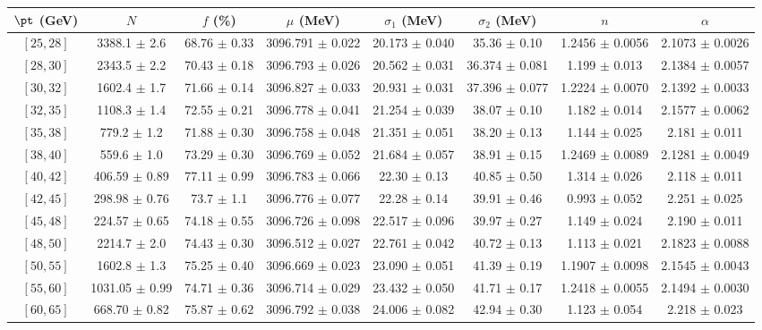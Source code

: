 \begin{tabular}{c||c|c|c|c|c|c|c}
$\pt$ (GeV) & $N$ & $f$ (\%) & $\mu$ (MeV) & $\sigma_1$ (MeV) & $\sigma_2$ (MeV) & $n$ & $\alpha$ \\
\hline
$[25, 28]$ & 3388.1 $\pm$ 2.6 & 68.76 $\pm$ 0.33 & 3096.791 $\pm$ 0.022 & 20.173 $\pm$ 0.040 & 35.36 $\pm$ 0.10 & 1.2456 $\pm$ 0.0056 & 2.1073 $\pm$ 0.0026\\
$[28, 30]$ & 2343.5 $\pm$ 2.2 & 70.43 $\pm$ 0.18 & 3096.793 $\pm$ 0.026 & 20.562 $\pm$ 0.031 & 36.374 $\pm$ 0.081 & 1.199 $\pm$ 0.013 & 2.1384 $\pm$ 0.0057\\
$[30, 32]$ & 1602.4 $\pm$ 1.7 & 71.66 $\pm$ 0.14 & 3096.827 $\pm$ 0.033 & 20.931 $\pm$ 0.031 & 37.396 $\pm$ 0.077 & 1.2224 $\pm$ 0.0070 & 2.1392 $\pm$ 0.0033\\
$[32, 35]$ & 1108.3 $\pm$ 1.4 & 72.55 $\pm$ 0.21 & 3096.778 $\pm$ 0.041 & 21.254 $\pm$ 0.039 & 38.07 $\pm$ 0.10 & 1.182 $\pm$ 0.014 & 2.1577 $\pm$ 0.0062\\
$[35, 38]$ & 779.2 $\pm$ 1.2 & 71.88 $\pm$ 0.30 & 3096.758 $\pm$ 0.048 & 21.351 $\pm$ 0.051 & 38.20 $\pm$ 0.13 & 1.144 $\pm$ 0.025 & 2.181 $\pm$ 0.011\\
$[38, 40]$ & 559.6 $\pm$ 1.0 & 73.29 $\pm$ 0.30 & 3096.769 $\pm$ 0.052 & 21.684 $\pm$ 0.057 & 38.91 $\pm$ 0.15 & 1.2469 $\pm$ 0.0089 & 2.1281 $\pm$ 0.0049\\
$[40, 42]$ & 406.59 $\pm$ 0.89 & 77.11 $\pm$ 0.99 & 3096.783 $\pm$ 0.066 & 22.30 $\pm$ 0.13 & 40.85 $\pm$ 0.50 & 1.314 $\pm$ 0.026 & 2.118 $\pm$ 0.011\\
$[42, 45]$ & 298.98 $\pm$ 0.76 & 73.7 $\pm$ 1.1 & 3096.776 $\pm$ 0.077 & 22.28 $\pm$ 0.14 & 39.91 $\pm$ 0.46 & 0.993 $\pm$ 0.052 & 2.251 $\pm$ 0.025\\
$[45, 48]$ & 224.57 $\pm$ 0.65 & 74.18 $\pm$ 0.55 & 3096.726 $\pm$ 0.098 & 22.517 $\pm$ 0.096 & 39.97 $\pm$ 0.27 & 1.149 $\pm$ 0.024 & 2.190 $\pm$ 0.011\\
$[48, 50]$ & 2214.7 $\pm$ 2.0 & 74.43 $\pm$ 0.30 & 3096.512 $\pm$ 0.027 & 22.761 $\pm$ 0.042 & 40.72 $\pm$ 0.13 & 1.113 $\pm$ 0.021 & 2.1823 $\pm$ 0.0088\\
$[50, 55]$ & 1602.8 $\pm$ 1.3 & 75.25 $\pm$ 0.40 & 3096.669 $\pm$ 0.023 & 23.090 $\pm$ 0.051 & 41.39 $\pm$ 0.19 & 1.1907 $\pm$ 0.0098 & 2.1545 $\pm$ 0.0043\\
$[55, 60]$ & 1031.05 $\pm$ 0.99 & 74.71 $\pm$ 0.36 & 3096.714 $\pm$ 0.029 & 23.432 $\pm$ 0.050 & 41.71 $\pm$ 0.17 & 1.2418 $\pm$ 0.0055 & 2.1494 $\pm$ 0.0030\\
$[60, 65]$ & 668.70 $\pm$ 0.82 & 75.87 $\pm$ 0.62 & 3096.792 $\pm$ 0.038 & 24.006 $\pm$ 0.082 & 42.94 $\pm$ 0.30 & 1.123 $\pm$ 0.054 & 2.218 $\pm$ 0.023\\

\end{tabular}
